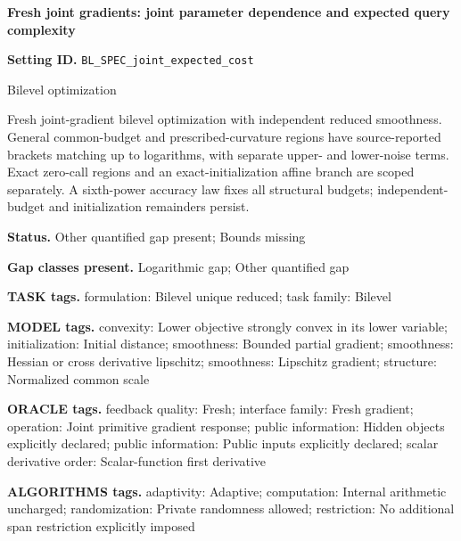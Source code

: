 \documentclass[10pt,a4paper]{article}
\begin{document}
\raggedright

{\LARGE\bfseries\sffamily\color{AtlasNavy} Fresh joint gradients: joint parameter dependence and expected query complexity\par}\vspace{5pt}


\textbf{Setting ID.} \texttt{BL\_\allowbreak{}SPEC\_\allowbreak{}joint\_\allowbreak{}expected\_\allowbreak{}cost}



Bilevel optimization



Fresh joint-gradient bilevel optimization with independent reduced smoothness. General common-budget and prescribed-curvature regions have source-reported brackets matching up to logarithms, with separate upper- and lower-noise terms. Exact zero-call regions and an exact-initialization affine branch are scoped separately. A sixth-power accuracy law fixes all structural budgets; independent-budget and initialization remainders persist.



\textbf{Status.} Other quantified gap present; Bounds missing



\textbf{Gap classes present.} Logarithmic gap; Other quantified gap



\textbf{TASK tags.} formulation: Bilevel unique reduced; task family: Bilevel



\textbf{MODEL tags.} convexity: Lower objective strongly convex in its lower variable; initialization: Initial distance; smoothness: Bounded partial gradient; smoothness: Hessian or cross derivative lipschitz; smoothness: Lipschitz gradient; structure: Normalized common scale



\textbf{ORACLE tags.} feedback quality: Fresh; interface family: Fresh gradient; operation: Joint primitive gradient response; public information: Hidden objects explicitly declared; public information: Public inputs explicitly declared; scalar derivative order: Scalar-function first derivative



\textbf{ALGORITHMS tags.} adaptivity: Adaptive; computation: Internal arithmetic uncharged; randomization: Private randomness allowed; restriction: No additional span restriction explicitly imposed
\end{document}
